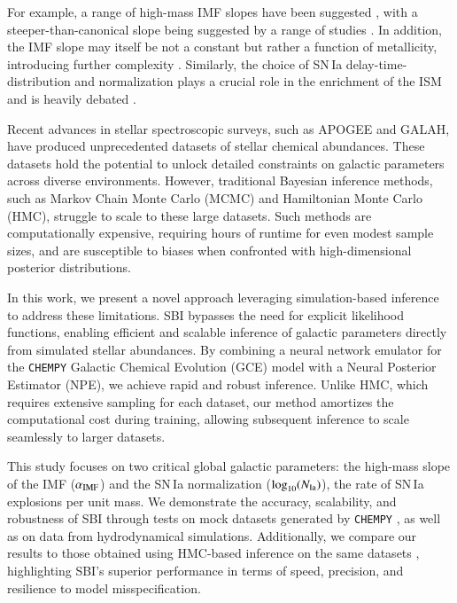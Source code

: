 \documentclass{aa}
\begin{document}
For example, a range of high-mass IMF slopes have been suggested \citep[Tab.\,7]{2016ApJ...824...82C}, with a steeper-than-canonical slope being suggested by a range of studies \citep[e.g.][]{2015ApJ...806..198W,Rybizki2015,Chabrier2014}. In addition, the IMF slope may itself be not a constant but rather a function of metallicity, introducing further complexity \citep[e.g.][]{2019MNRAS.482..118G,Martin2019}. Similarly, the choice of SN\,Ia delay-time-distribution and normalization plays a crucial role in the enrichment of the ISM \citep[e.g.][]{Buck2021} and is heavily debated \citep{2010ApJ...722.1879M,2012MNRAS.426.3282M,2015ApJ...810..137J}.

Recent advances in stellar spectroscopic surveys, such as APOGEE and GALAH, have produced unprecedented datasets of stellar chemical abundances. These datasets hold the potential to unlock detailed constraints on galactic parameters across diverse environments. However, traditional Bayesian inference methods, such as Markov Chain Monte Carlo (MCMC) and Hamiltonian Monte Carlo (HMC), struggle to scale to these large datasets. Such methods are computationally expensive, requiring hours of runtime for even modest sample sizes, and are susceptible to biases when confronted with high-dimensional posterior distributions.

In this work, we present a novel approach leveraging simulation-based inference \citep[SBI, e.g.][]{Cranmer2020} to address these limitations. SBI bypasses the need for explicit likelihood functions, enabling efficient and scalable inference of galactic parameters directly from simulated stellar abundances. By combining a neural network emulator for the \texttt{CHEMPY} Galactic Chemical Evolution (GCE) model with a Neural Posterior Estimator (NPE), we achieve rapid and robust inference. Unlike HMC, which requires extensive sampling for each dataset, our method amortizes the computational cost during training, allowing subsequent inference to scale seamlessly to larger datasets.

This study focuses on two critical global galactic parameters: 
the high-mass slope of the \citet[Tab.\,1]{2003PASP..115..763C} IMF ($\alpha_{\rm IMF}$) and the SN\,Ia normalization ($\log_{10}(N_{\rm Ia})$), the rate of SN\,Ia explosions per unit mass. We demonstrate the accuracy, scalability, and robustness of SBI through tests on mock datasets generated by \texttt{CHEMPY} \citep{Rybizki_2017}, as well as on data from hydrodynamical simulations. Additionally, we compare our results to those obtained using HMC-based inference on the same datasets \citep[see][]{Philcox_2019}, highlighting SBI's superior performance in terms of speed, precision, and resilience to model misspecification.
\end{document}
